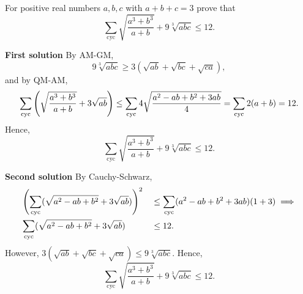 \begin{problem}
For positive real numbers $a, b, c$ with $a + b + c = 3$ prove that
\[\sum_{\text{cyc}}\sqrt{\frac{a^3+b^3}{a+b}}+9\sqrt[3]{abc}\le12.\]
\end{problem}

\textbf{\textcolor{color1}{First solution}} By AM-GM,
\[
	9\sqrt[3]{abc} \ge 3(\sqrt{ab}+\sqrt{bc}+\sqrt{ca}),
\]
and by QM-AM,
\[
	\sum_{\text{cyc}} \left(\sqrt{\frac{a^3+b^3}{a+b}}+3\sqrt{ab}\right) \le \sum_{\text{cyc}} 4\sqrt{\frac{a^2-ab+b^2+3ab}{4}} = \sum_{\text{cyc}} 2(a+b) = 12.
\]
Hence,
\[\sum_{\text{cyc}}\sqrt{\frac{a^3+b^3}{a+b}}+9\sqrt[3]{abc}\le12.\]

\textbf{\textcolor{color1}{Second solution}} By Cauchy-Schwarz,
\begin{align*}
	 & \left(\sum_{\text{cyc}}(\sqrt{a^2-ab+b^2} + 3\sqrt{ab})\right)^2 &  & \le \sum_{\text{cyc}}(a^2-ab+b^2 + 3ab)(1+3) \implies \\
	 & \sum_{\text{cyc}}(\sqrt{a^2-ab+b^2} + 3\sqrt{ab})                &  & \le 12.
\end{align*}
However, $3(\sqrt{ab}+\sqrt{bc}+\sqrt{ca}) \le 9\sqrt[3]{abc}$. Hence,
\[\sum_{\text{cyc}}\sqrt{\frac{a^3+b^3}{a+b}}+9\sqrt[3]{abc}\le12.\]

